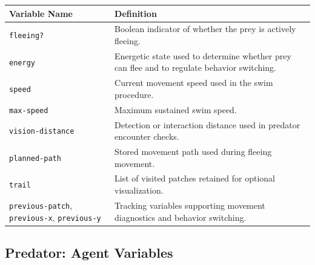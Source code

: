 \documentclass[
]{book}
\begin{document}
\begin{longtable}[]{@{}
  >{\raggedright\arraybackslash}p{}
  >{\raggedright\arraybackslash}p{}@{}}
\toprule\noalign{}
\begin{minipage}[b]{\linewidth}\raggedright
Variable Name
\end{minipage} & \begin{minipage}[b]{\linewidth}\raggedright
Definition
\end{minipage} \\
\midrule\noalign{}
\endhead
\bottomrule\noalign{}
\endlastfoot
\texttt{fleeing?} & Boolean indicator of whether the prey is actively fleeing. \\
\texttt{energy} & Energetic state used to determine whether prey can flee and to regulate behavior switching. \\
\texttt{speed} & Current movement speed used in the swim procedure. \\
\texttt{max-speed} & Maximum sustained swim speed. \\
\texttt{vision-distance} & Detection or interaction distance used in predator encounter checks. \\
\texttt{planned-path} & Stored movement path used during fleeing movement. \\
\texttt{trail} & List of visited patches retained for optional visualization. \\
\texttt{previous-patch}, \texttt{previous-x}, \texttt{previous-y} & Tracking variables supporting movement diagnostics and behavior switching. \\
\end{longtable}

\subsection{Predator: Agent Variables}\label{predator-agent-variables}
\end{document}
